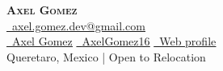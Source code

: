 \textbf{\Huge \scshape Axel Gomez} \\ \vspace{3pt}
\href{mailto:axel.gomez.dev@gmail.com}{\faEnvelope\ \underline{axel.gomez.dev@gmail.com}} \\
\href{https://www.linkedin.com/in/axelgomez16}{\faLinkedin\ \underline{Axel Gomez}} \quad
\href{https://github.com/AxelGomez16}{\faGithub\ \underline{AxelGomez16}} \quad
\href{https://axelgomez16.github.io/AxelGomez16/}{\faGlobe\ \underline{Web profile}} \\
\vspace{2pt}
{\footnotesize Queretaro, Mexico | Open to Relocation}